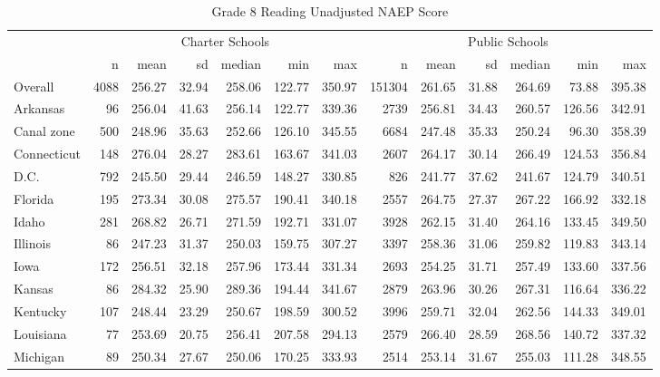 \begin{sidewaystable}[ht]
\centering
\caption{Grade 8 Reading Unadjusted NAEP Score} 
\label{tab:g8read-unadjscore}
\begin{tabular}{lrrrrrr@{\extracolsep{10pt}}rrrrrr}
  \hline & \multicolumn{6}{c}{Charter Schools} & \multicolumn{6}{c}{Public Schools} \\ \cline{2-7} \cline{8-13} & n & mean & sd & median & min & max & n & mean & sd & median & min & max \\ 
  \hline
Overall & 4088 & 256.27 & 32.94 & 258.06 & 122.77 & 350.97 & 151304 & 261.65 & 31.88 & 264.69 & 73.88 & 395.38 \\ 
  Arkansas &  96 & 256.04 & 41.63 & 256.14 & 122.77 & 339.36 & 2739 & 256.81 & 34.43 & 260.57 & 126.56 & 342.91 \\ 
  Canal zone & 500 & 248.96 & 35.63 & 252.66 & 126.10 & 345.55 & 6684 & 247.48 & 35.33 & 250.24 & 96.30 & 358.39 \\ 
  Connecticut & 148 & 276.04 & 28.27 & 283.61 & 163.67 & 341.03 & 2607 & 264.17 & 30.14 & 266.49 & 124.53 & 356.84 \\ 
  D.C. & 792 & 245.50 & 29.44 & 246.59 & 148.27 & 330.85 & 826 & 241.77 & 37.62 & 241.67 & 124.79 & 340.51 \\ 
  Florida & 195 & 273.34 & 30.08 & 275.57 & 190.41 & 340.18 & 2557 & 264.75 & 27.37 & 267.22 & 166.92 & 332.18 \\ 
  Idaho & 281 & 268.82 & 26.71 & 271.59 & 192.71 & 331.07 & 3928 & 262.15 & 31.40 & 264.16 & 133.45 & 349.50 \\ 
  Illinois &  86 & 247.23 & 31.37 & 250.03 & 159.75 & 307.27 & 3397 & 258.36 & 31.06 & 259.82 & 119.83 & 343.14 \\ 
  Iowa & 172 & 256.51 & 32.18 & 257.96 & 173.44 & 331.34 & 2693 & 254.25 & 31.71 & 257.49 & 133.60 & 337.56 \\ 
  Kansas &  86 & 284.32 & 25.90 & 289.36 & 194.44 & 341.67 & 2879 & 263.96 & 30.26 & 267.31 & 116.64 & 336.22 \\ 
  Kentucky & 107 & 248.44 & 23.29 & 250.67 & 198.59 & 300.52 & 3996 & 259.71 & 32.04 & 262.56 & 144.33 & 349.01 \\ 
  Louisiana &  77 & 253.69 & 20.75 & 256.41 & 207.58 & 294.13 & 2579 & 266.40 & 28.59 & 268.56 & 140.72 & 337.32 \\ 
  Michigan &  89 & 250.34 & 27.67 & 250.06 & 170.25 & 333.93 & 2514 & 253.14 & 31.67 & 255.03 & 111.28 & 348.55 \\ 

\end{tabular}
\end{sidewaystable}
